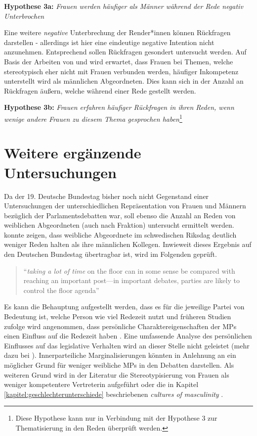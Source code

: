 \documentclass[12pt, 
    twoside=false, 
    bibliography=totoc, 
    numbers=endperiod, 
    headings=normal, 
    toc=chapterentrydotfill
    ]{scrbook}
\begin{document}
\textbf{Hypothese 3a:} \emph{Frauen werden häufiger als Männer während der Rede negativ Unterbrochen}

Eine weitere \emph{negative} Unterbrechung der Render*innen können Rückfragen darstellen - allerdings ist hier eine eindeutige negative Intention nicht anzunehmen. Entsprechend sollen Rückfragen gesondert untersucht werden. Auf Basis der Arbeiten von \textcite{brescoll_2011} und \textcite{eagly_2002} wird erwartet, dass Frauen bei Themen, welche stereotypisch eher nicht mit Frauen verbunden werden, häufiger Inkompetenz unterstellt wird als männlichen Abgeordneten. Dies kann sich in der Anzahl an Rückfragen äußern, welche während einer Rede gestellt werden. 

\textbf{Hypothese 3b:} \emph{Frauen erfahren häufiger Rückfragen in ihren Reden, wenn wenige andere Frauen zu diesem Thema gesprochen haben}\footnote{Diese Hypothese kann nur in Verbindung mit der Hypothese 3 zur Thematisierung in den Reden überprüft werden.}

\section{Weitere ergänzende Untersuchungen}

Da der 19. Deutsche Bundestag bisher noch nicht Gegenstand einer Untersuchungen der unterschiedlichen Repräsentation von Frauen und Männern bezüglich der Parlamentsdebatten war, soll ebenso die Anzahl an Reden von weiblichen Abgeordneten (auch nach Fraktion) untersucht ermittelt werden. \textcite{back_2014} konnte zeigen, dass weibliche Abgeordnete im schwedischen Riksdag deutlich weniger Reden halten als ihre männlichen Kollegen. Inwieweit dieses Ergebnis auf den Deutschen Bundestag übertragbar ist, wird im Folgenden geprüft.

\begin{quote}
     \enquote{\emph{taking a lot of time} on the floor can in some sense be compared with reaching an important post—in important debates, parties are likely to control the floor agenda} \parencites[507]{back_2014}
\end{quote}

Es kann die Behauptung aufgestellt werden, dass es für die jeweilige Partei von Bedeutung ist, welche Person wie viel Redezeit nutzt \parencite[vgl.][]{proksch_2012} und früheren Studien zufolge wird angenommen, dass persönliche Charaktereigenschaften der MPs einen Einfluss auf die Redezeit haben \parencite[505]{back_2014}. Eine umfassende Analyse des persönlichen Einflusses auf das legislative Verhalten wird an dieser Stelle nicht geleistet (mehr dazu bei \textcite{saalfeld_2011}). Innerparteiliche Marginalisierungen könnten in Anlehnung an \textcite[507]{back_2014} ein möglicher Grund für weniger weibliche MPs in den Debatten darstellen. Als weiteren Grund wird in der Literatur die Stereotypisierung von Frauen als weniger kompetentere Vertreterin aufgeführt oder die in Kapitel \ref{kapitel:geschlechterunterschiede} beschriebenen \emph{cultures of masculinity} \parencites[507]{back_2014}{lovenduski_2005}. 
\end{document}
